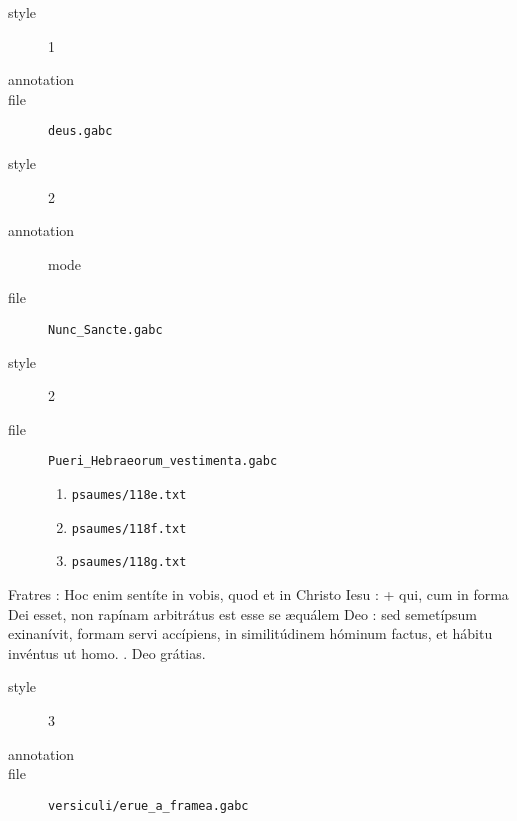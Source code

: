

\begin{gabc}
\begin{description}
\item[style] 1
\item[annotation] 
\item[file] \verb|deus.gabc|
\end{description}
\end{gabc}


\begin{gabc}
\begin{description}
\item[style] 2
\item[annotation] mode
\item[file] \verb|Nunc_Sancte.gabc|
\end{description}
\end{gabc}

\begin{gabc}
\begin{description}
\item[style] 2
\item[file] \verb|Pueri_Hebraeorum_vestimenta.gabc|
\begin{enumerate}
\item  \verb|psaumes/118e.txt|
\item  \verb|psaumes/118f.txt|
\item  \verb|psaumes/118g.txt|
\end{enumerate}
\end{description}
\end{gabc}


\begin{lectio}
Fratres : Hoc enim sent\'ite in vobis, quod et in Christo Iesu : + qui, cum in forma Dei esset, non rap\'inam arbitr\'atus est esse se {\ae}qu\'alem Deo :
sed semet\'ipsum exinan\'ivit, formam servi acc\'ipiens, \*
in similit\'udinem h\'ominum factus, et h\'abitu inv\'entus ut homo.
\R. Deo gr\'atias.
\end{lectio}

\begin{gabc}
\begin{description}
\item[style] 3
\item[annotation] 
\item[file] \verb|versiculi/erue_a_framea.gabc|
\end{description}
\end{gabc}

